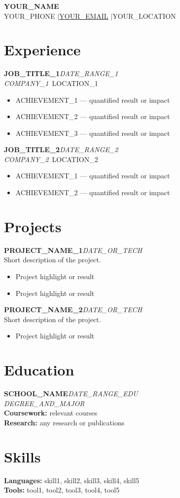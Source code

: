 \documentclass[11pt,a4paper]{article}
\newcommand{\expentry}[5]{
  \noindent\textbf{#1}\hfill\textit{#2}\\
  \textit{#3}{\small\ #4}\\[2pt]
  \begin{itemize}[nosep,leftmargin=1.5em,topsep=0pt,partopsep=0pt]
    #5
  \end{itemize}
  \vspace{4pt}
}
\newcommand{\eduentry}[4]{
  \noindent\textbf{#1}\hfill\textit{#2}\\
  \textit{#3}\\[2pt]
  #4
  \vspace{4pt}
}
\newcommand{\projentry}[4]{
  \noindent\textbf{#1}\hfill\textit{#2}\\
  {#3}\\[2pt]
  \begin{itemize}[nosep,leftmargin=1.5em,topsep=0pt,partopsep=0pt]
    #4
  \end{itemize}
  \vspace{4pt}
}
\begin{document}
\begin{center}
  {\LARGE\bfseries YOUR_NAME} \\[6pt]
  YOUR\_PHONE \quad$\mid$\quad \href{mailto:YOUR\_EMAIL}{YOUR\_EMAIL} \quad$\mid$\quad YOUR\_LOCATION
\end{center}

\section{Experience}

\expentry{JOB\_TITLE\_1}{DATE\_RANGE\_1}{COMPANY\_1}{LOCATION\_1}{
  \item ACHIEVEMENT\_1 — quantified result or impact
  \item ACHIEVEMENT\_2 — quantified result or impact
  \item ACHIEVEMENT\_3 — quantified result or impact
}

\expentry{JOB\_TITLE\_2}{DATE\_RANGE\_2}{COMPANY\_2}{LOCATION\_2}{
  \item ACHIEVEMENT\_1 — quantified result or impact
  \item ACHIEVEMENT\_2 — quantified result or impact
}

\section{Projects}

\projentry{PROJECT\_NAME\_1}{DATE\_OR\_TECH}{Short description of the project.}{
  \item Project highlight or result
  \item Project highlight or result
}

\projentry{PROJECT\_NAME\_2}{DATE\_OR\_TECH}{Short description of the project.}{
  \item Project highlight or result
}

\section{Education}

\eduentry{SCHOOL\_NAME}{DATE\_RANGE\_EDU}{DEGREE\_AND\_MAJOR}{
  \textbf{Coursework:} relevant courses \\
  \textbf{Research:} any research or publications
}

\section{Skills}
\textbf{Languages:} skill1, skill2, skill3, skill4, skill5 \\
\textbf{Tools:} tool1, tool2, tool3, tool4, tool5
\end{document}
